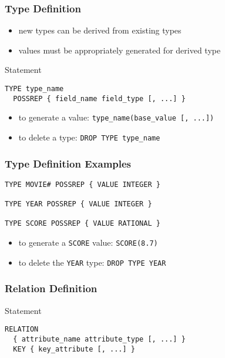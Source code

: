 \documentclass[dvipsnames]{beamer}
\theoremstyle{plain}
\begin{document}
\begin{frame}[fragile]
  \frametitle{Type Definition}

  \begin{itemize}
    \item new types can be derived from existing types
    \item values must be appropriately generated for derived type
  \end{itemize}

  \pause
  \begin{block}{Statement}
    \begin{lstlisting}
TYPE type_name
  POSSREP { field_name field_type [, ...] }
    \end{lstlisting}
  \end{block}

  \pause
  \begin{itemize}
    \item to generate a value: \lstinline!type_name(base_value [, ...])!

    \pause
    \item to delete a type: \lstinline!DROP TYPE type_name!
  \end{itemize}
\end{frame}

\begin{frame}[fragile]
  \frametitle{Type Definition Examples}

  \begin{example}
    \begin{lstlisting}
TYPE MOVIE# POSSREP { VALUE INTEGER }

TYPE YEAR POSSREP { VALUE INTEGER }

TYPE SCORE POSSREP { VALUE RATIONAL }
    \end{lstlisting}

    \pause
    \bigskip
    \begin{itemize}
      \item to generate a \texttt{SCORE} value: \lstinline!SCORE(8.7)!

      \pause
      \item to delete the \texttt{YEAR} type: \lstinline!DROP TYPE YEAR!
    \end{itemize}
  \end{example}
\end{frame}

\begin{frame}[fragile]
  \frametitle{Relation Definition}

  \begin{block}{Statement}
    \begin{lstlisting}
RELATION
  { attribute_name attribute_type [, ...] }
  KEY { key_attribute [, ...] }
    \end{lstlisting}
  \end{block}
\end{frame}
\end{document}

